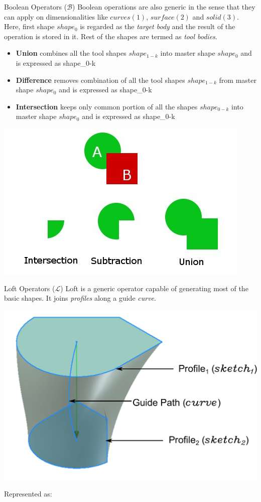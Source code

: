\begin{frame}{Boolean Operators ($\mathcal{B}$)}
Boolean operations are also generic in the sense that they can apply on dimensionalities like $curves(1)$, $surface(2)$ and $solid(3)$.  Here, first shape $shape_0$ is regarded as the {\em target body} and the result of the operation is stored in it. Rest of the shapes are termed as {\em tool bodies}.

\begin{itemize}[noitemsep,label=\textbullet,topsep=2pt,parsep=2pt,partopsep=2pt]
\item {\bf Union} combines all the tool shapes ${shape_{1-k}}$ into master shape $shape_0$ and is expressed as	 {shape_{0-k}} 	
\item {\bf Difference} removes combination of all the tool shapes ${shape_{1-k}}$ from master shape $shape_0$ and is expressed as	 {shape_{0-k}}  
\item {\bf Intersection} keeps only common portion of all the shapes ${shape_{0-k}}$ into master shape $shape_0$ and is expressed as	 {shape_{0-k}} 	 
\end{itemize}
\begin{center}\includegraphics[width=0.4\linewidth]{../Common/images/Booleans.jpg}\end{center}
\end{frame}

\begin{frame}{Loft Operators ($\mathcal{L}$)}
Loft is a generic operator capable of generating most of the basic shapes. It joins {\em profiles} along a guide {\em curve}. 

\centering \includegraphics[width=0.8\linewidth]{../Common/images//LoftPreview.pdf} 


Represented as:

\end{frame}

